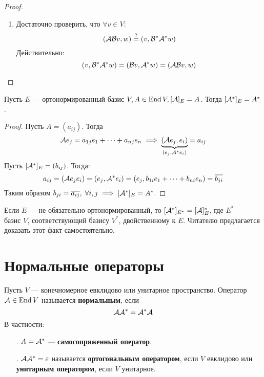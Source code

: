 \documentclass[../main.tex]{subfiles}
\begin{document}
\begin{proof}
\begin{enumerate}
    \item Достаточно проверить, что $\forall v \in V$:
    \begin{equation*}
      (\mathcal{A} \mathcal{B} v, w) \overset{?}{=} (v, \mathcal{B}^{*} \mathcal{A}^{*} w)
    \end{equation*}
    Действительно:
    \begin{equation*}
      (v, \mathcal{B}^{*} \mathcal{A}^{*} w) =
      (\mathcal{B} v, \mathcal{A}^{*} w) =
      (\mathcal{A} \mathcal{B} v, w)
    \end{equation*}
  \end{enumerate}
\end{proof}

\begin{theorem-non}
\label{non:8.16}
  Пусть $E$ --- ортонормированный базис $V, A \in \operatorname{End} V, [\mathcal{A}]_E = A$. Тогда $[\mathcal{A}^{*}]_E = A^{*}$.
\end{theorem-non}
\begin{proof}
  Пусть $A = (a_{ij})$. Тогда
  \begin{equation*}
    \mathcal{A} e_j = a_{1 j} e_1 + \dotsb + a_{n j} e_n \implies
    \underbrace{(\mathcal{A} e_j, e_i)}_{(e_j, \mathcal{A}^{*} e_i)} = a_{i j}
  \end{equation*}
  Пусть $[\mathcal{A}^{*}]_E = (b_{i j})$. Тогда:
  \begin{equation*}
    a_{i j} =
    (\mathcal{A} e_j e_i) =
    (e_j, \mathcal{A}^{*} e_i) =
    (e_j, b_{1 i} e_1 + \dotsb + b_{n i} e_n) =
    \overline{b_{j i}}
  \end{equation*}
  Таким образом $b_{j i} = \overline{a_{i j}},\; \forall i, j \implies [\mathcal{A}^{*}]_E = A^{*}$.
\end{proof}

\begin{remark}
  Если $E$ --- не обязательно ортонормированный, то $[\mathcal{A}^{*}]_{E^{*}} = [\mathcal{A}]_E^{*}$, где $E^{*}$ --- базис $V$, соответствующий базису $V^{*}$, двойственному к $E$. Читателю предлагается доказать этот факт самостоятельно.
\end{remark}

\section{Нормальные операторы}
\begin{definition}
  Пусть $V$ --- конечномерное евклидово или унитарное пространство. Оператор $\mathcal{A} \in \operatorname{End} V$ называется \textbf{нормальным}, если
  \begin{equation*}
    \mathcal{A} \mathcal{A}^{*} = \mathcal{A}^{*} \mathcal{A}
  \end{equation*}
  В частности:
  \begin{enumerate}
    \item[\rom{1}.] $A = \mathcal{A}^{*}$ --- \textbf{самосопряженный оператор}.
    \item[\rom{2}.] $\mathcal{A} \mathcal{A}^{*} = \varepsilon$ называется \textbf{ортогональным оператором}, если $V$ евклидово или \textbf{унитарным оператором}, если $V$ унитарное.
  \end{enumerate}
\end{definition}
\end{document}
